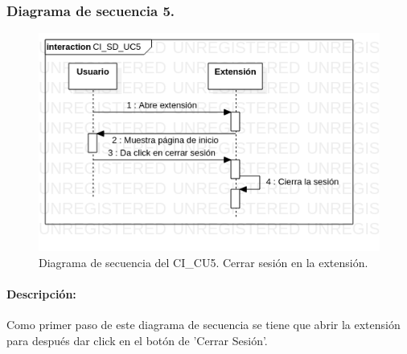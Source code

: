 \documentclass[12pt, a4paper, titlepage]{report}
\begin{document}
    			
    			\subsubsection{Diagrama de secuencia 5.}
        			\begin{figure}[H]
        				\begin{center}    		    	\includegraphics[width=15cm]{./imagenes/Disenio/Componente_1/CI_SD_UC5.png}
        				\caption[Diagrama de secuencia 5 del Componente I]{Diagrama de secuencia del CI\_CU5. Cerrar sesión en la extensión.}
        				\end{center}
        			\end{figure}
        			
        			\paragraph{Descripción:}
        		        Como primer paso de este diagrama de secuencia se tiene que abrir la extensión para después dar click en el botón de 'Cerrar Sesión'.
        		
        		
\end{document}
